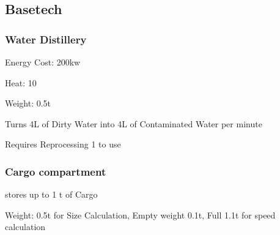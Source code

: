 \subsection{Basetech}\label{subsec:basetech}
\subsubsection{Water Distillery}\label{subsubsec:water-distillery}
Energy Cost: 200kw\par
Heat: 10\par
Weight: 0.5t\par
Turns 4L of Dirty Water into 4L of Contaminated Water per minute\par
Requires Reprocessing 1 to use\par

\subsubsection{Cargo compartment}\label{subsubsec:cargo-compartment}
stores up to 1 t of Cargo\par
Weight: 0.5t for Size Calculation, Empty weight 0.1t, Full 1.1t for speed calculation
\par
